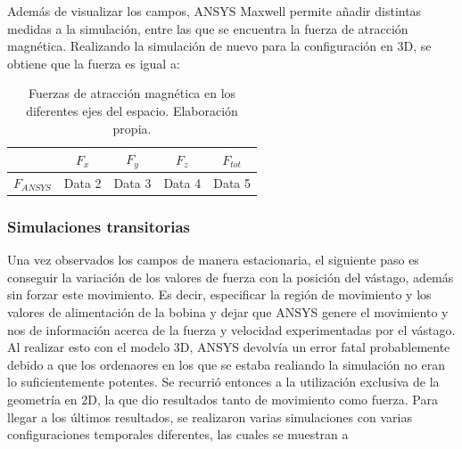 Además de visualizar los campos, ANSYS Maxwell permite añadir distintas medidas a la simulación, entre las que se encuentra la fuerza de atracción magnética. Realizando la simulación de nuevo para la configuración en 3D, se obtiene que la fuerza es igual a:

\begin{table}[h]
    \centering
    \begin{tabular}{|c|c|c|c|c|}
        \hline
        & \(F_x\) & \(F_y\) & \(F_z\) & \(F_{tot}\) \\
        \hline
        \(F_{ANSYS}\) & Data 2 & Data 3 & Data 4 & Data 5 \\
        \hline
    \end{tabular}
    \caption{Fuerzas de atracción magnética en los diferentes ejes del espacio. Elaboración propia.}
    \label{tab:fuerzas}
\end{table}

\subsubsection{Simulaciones transitorias}
Una vez observados los campos de manera estacionaria, el siguiente paso es conseguir la variación de los valores de fuerza con la posición del vástago, además sin forzar este movimiento. Es decir, especificar la región de movimiento y los valores de alimentación de la bobina y dejar que ANSYS genere el movimiento y nos de información acerca de la fuerza y velocidad experimentadas por el vástago. Al realizar esto con el modelo 3D, ANSYS devolvía un error fatal probablemente debido a que los ordenaores en los que se estaba realiando la simulación no eran lo suficientemente potentes. Se recurrió entonces a la utilización exclusiva de la geometría en 2D, la que dio resultados tanto de movimiento como fuerza. Para llegar a los últimos resultados, se realizaron varias simulaciones con varias configuraciones temporales diferentes, las cuales se muestran a 
